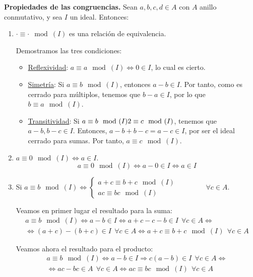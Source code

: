 \textbf{Propiedades de las congruencias.}
Sean $a,b,c,d \in A$ con $A$ anillo conmutativo, y sea $I$ un ideal. Entonces:
\begin{enumerate}
    \item $\cdot\equiv\cdot\mod(I)$ es una relación de equivalencia.

    Demostramos las tres condiciones:
    \begin{itemize}
        \item \underline{Reflexividad}: $a\equiv a\mod (I)\Longleftrightarrow 0\in I$, lo cual es cierto.

        \item \underline{Simetría}: Si $a\equiv b\mod (I)$, entonces $a-b\in I$. Por tanto, como es cerrado para múltiplos, tenemos que $b-a\in I$, por lo que $b\equiv a\mod(I)$.

        \item \underline{Transitividad}: Si $a\equiv b\mod(I)2 \equiv c\mod (I)$, tenemos que $a-b,b-c\in I$. Entonces, $a-b+b-c=a-c\in I$, por ser el ideal cerrado para sumas. Por tanto, $a\equiv c \mod (I)$.
    \end{itemize}

    \item $a\equiv 0\mod(I) \Longleftrightarrow a\in I$.
    $$a\equiv 0\mod(I) \Longleftrightarrow a-0 \in I \Longleftrightarrow a \in I$$

    \item Si $a\equiv b\mod(I) \Longleftrightarrow \left\{ \begin{array}{l}
        a+c \equiv b+c\mod(I) \\
        ac \equiv bc\mod(I)
    \end{array} \right.\qquad \qquad \forall c \in A$.

    Veamos en primer lugar el resultado para la suma:
    \begin{multline*}
        a\equiv b\mod(I) \Longleftrightarrow a-b \in I \Longleftrightarrow a+c-c-b \in I ~~\forall c \in A \Longleftrightarrow \\
        \Longleftrightarrow (a+c)-(b+c) \in I ~~\forall c \in A \Longleftrightarrow a+c\equiv b+c\mod(I)~~\forall c \in A
    \end{multline*}

    Veamos ahora el resultado para el producto:
    \begin{multline*}
        a\equiv b\mod(I) \Longleftrightarrow a-b \in I \Longrightarrow c(a-b)\in I~~\forall c \in A \Longleftrightarrow \\
        \Longleftrightarrow ac - bc \in A ~~\forall c \in A \Longleftrightarrow ac \equiv bc\mod(I) ~~\forall c \in A 
    \end{multline*}


\end{enumerate}
